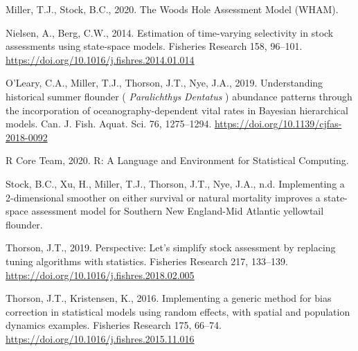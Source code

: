 \documentclass[]{article}
\begin{document}
\leavevmode\hypertarget{ref-miller2020Woods}{}%
Miller, T.J., Stock, B.C., 2020. The Woods Hole Assessment Model (WHAM).

\leavevmode\hypertarget{ref-nielsen2014Estimation}{}%
Nielsen, A., Berg, C.W., 2014. Estimation of time-varying selectivity in
stock assessments using state-space models. Fisheries Research 158,
96--101. \url{https://doi.org/10.1016/j.fishres.2014.01.014}

\leavevmode\hypertarget{ref-oleary2019Understanding}{}%
O'Leary, C.A., Miller, T.J., Thorson, J.T., Nye, J.A., 2019.
Understanding historical summer flounder ( \emph{Paralichthys}
\emph{Dentatus} ) abundance patterns through the incorporation of
oceanography-dependent vital rates in Bayesian hierarchical models. Can.
J. Fish. Aquat. Sci. 76, 1275--1294.
\url{https://doi.org/10.1139/cjfas-2018-0092}

\leavevmode\hypertarget{ref-rcoreteam2020Language}{}%
R Core Team, 2020. R: A Language and Environment for Statistical
Computing.

\leavevmode\hypertarget{ref-stockthisissueImplementing}{}%
Stock, B.C., Xu, H., Miller, T.J., Thorson, J.T., Nye, J.A., n.d.
Implementing a 2-dimensional smoother on either survival or natural
mortality improves a state-space assessment model for Southern New
England-Mid Atlantic yellowtail flounder.

\leavevmode\hypertarget{ref-thorson2019Perspective}{}%
Thorson, J.T., 2019. Perspective: Let's simplify stock assessment by
replacing tuning algorithms with statistics. Fisheries Research 217,
133--139. \url{https://doi.org/10.1016/j.fishres.2018.02.005}

\leavevmode\hypertarget{ref-thorson2016Implementing}{}%
Thorson, J.T., Kristensen, K., 2016. Implementing a generic method for
bias correction in statistical models using random effects, with spatial
and population dynamics examples. Fisheries Research 175, 66--74.
\url{https://doi.org/10.1016/j.fishres.2015.11.016}

\pagebreak
\end{document}
